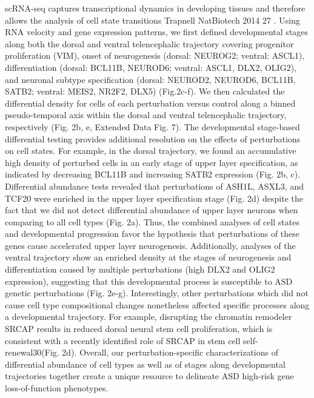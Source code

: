 scRNA-seq captures transcriptional dynamics in developing tissues and therefore allows the analysis of cell state transitions {Trapnell NatBiotech 2014} 27 . Using RNA velocity and gene expression patterns, we first defined developmental stages along both the dorsal and ventral telencephalic trajectory covering progenitor proliferation (VIM), onset of neurogenesis (dorsal: NEUROG2; ventral: ASCL1), differentiation (dorsal: BCL11B, NEUROD6; ventral: ASCL1, DLX2, OLIG2), and neuronal subtype specification (dorsal: NEUROD2, NEUROD6, BCL11B, SATB2; ventral: MEIS2, NR2F2, DLX5) (Fig.2c-f). We then calculated the differential density for cells of each perturbation versus control along a binned pseudo-temporal axis within the dorsal and ventral telencephalic trajectory, respectively (Fig. 2b, e, Extended Data Fig. 7). 
The developmental stage-based differential testing provides additional resolution on the effects of perturbations on cell states. For example, in the dorsal trajectory, we found an accumulative high density of perturbed cells in an early stage of upper layer specification, as indicated by decreasing BCL11B and increasing SATB2 expression (Fig. 2b, c). Differential abundance tests revealed that perturbations of ASH1L, ASXL3, and TCF20 were enriched in the upper layer specification stage (Fig. 2d) despite the fact that we did not detect differential abundance of upper layer neurons when comparing to all cell types (Fig. 2a). Thus, the combined analyses of cell states and developmental progression favor the hypothesis that perturbations of these genes cause accelerated upper layer neurogenesis. Additionally, analyses of the ventral trajectory show an enriched density at the stages of neurogenesis and differentiation caused by multiple perturbations (high DLX2 and OLIG2 expression), suggesting that this developmental process is susceptible to ASD genetic perturbations (Fig. 2e-g). Interestingly, other perturbations which did not cause cell type compositional changes nonetheless affected specific processes along a developmental trajectory. For example, disrupting the chromatin remodeler SRCAP results in reduced dorsal neural stem cell proliferation, which is consistent with a recently identified role of SRCAP in stem cell self-renewal30(Fig. 2d). 
Overall, our perturbation-specific characterizations of differential abundance of cell types as well as of stages along developmental trajectories together create a unique resource to delineate ASD high-risk gene loss-of-function phenotypes.

